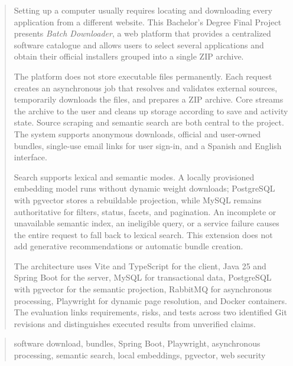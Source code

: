\documentclass[a4paper,12pt,oneside]{memoir}
\begin{document}
\clearpage

\renewcommand*\abstractname{Abstract}
\begin{abstract}
Setting up a computer usually requires locating and downloading every application from a different website. This Bachelor's Degree Final Project presents \emph{Batch Downloader}, a web platform that provides a centralized software catalogue and allows users to select several applications and obtain their official installers grouped into a single ZIP archive.

The platform does not store executable files permanently. Each request creates an asynchronous job that resolves and validates external sources, temporarily downloads the files, and prepares a ZIP archive. Core streams the archive to the user and cleans up storage according to save and activity state. Source scraping and semantic search are both central to the project. The system supports anonymous downloads, official and user-owned bundles, single-use email links for user sign-in, and a Spanish and English interface.

Search supports lexical and semantic modes. A locally provisioned embedding model runs without dynamic weight downloads; PostgreSQL with pgvector stores a rebuildable projection, while MySQL remains authoritative for filters, status, facets, and pagination. An incomplete or unavailable semantic index, an ineligible query, or a service failure causes the entire request to fall back to lexical search. This extension does not add generative recommendations or automatic bundle creation.

The architecture uses Vite and TypeScript for the client, Java 25 and Spring Boot for the server, MySQL for transactional data, PostgreSQL with pgvector for the semantic projection, RabbitMQ for asynchronous processing, Playwright for dynamic page resolution, and Docker containers. The evaluation links requirements, risks, and tests across two identified Git revisions and distinguishes executed results from unverified claims.
\end{abstract}

\renewcommand*\abstractname{Keywords}
\begin{abstract}
software download, bundles, Spring Boot, Playwright, asynchronous processing, semantic search, local embeddings, pgvector, web security
\end{abstract}

\clearpage

\tableofcontents

\clearpage

\listoffigures

\clearpage

\listoftables
\clearpage


\clearpage

\clearpage

\mainmatter











\end{document}
